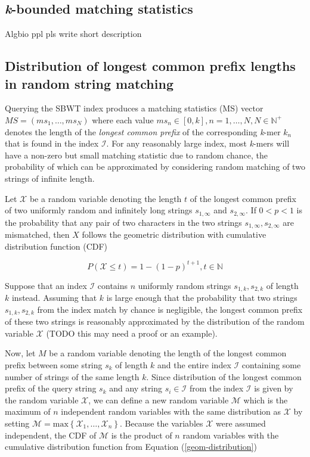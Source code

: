 \documentclass[unnumsec,webpdf,contemporary,large]{oup-authoring-template}%
\theoremstyle{thmstyleone}%
\theoremstyle{thmstyletwo}%
\theoremstyle{thmstylethree}%
\begin{document}
\subsection{\textit{k}-bounded matching statistics}
Algbio ppl pls write short description

\subsection{Distribution of longest common prefix lengths in random string matching}

Querying the SBWT index produces a matching statistics (MS) vector $MS = \left(ms_1, \dots, ms_N\right)$ where each value $ms_n \in \left[0,k\right], n = 1, \dots, N, N \in \mathbb{N}^+$ denotes the length of the \emph{longest common prefix} of the corresponding \emph{k}-mer $k_n$ that is found in the index $\mathcal{I}$. For any reasonably large index, most \emph{k}-mers will have a non-zero but small matching statistic due to random chance, the probability of which can be approximated by considering random matching of two strings of infinite length.

Let $\mathcal{X}$ be a random variable denoting the length $t$ of the longest common prefix of two uniformly random and infinitely long strings $s_{1,\infty}$ and $s_{2,\infty}$. If  $0 < p < 1$ is the probability that any pair of two characters in the two strings $s_{1,\infty}, s_{2,\infty}$ are mismatched, then $X$ follows the geometric distribution with cumulative distribution function (CDF)

\begin{equation}
    P\left(\mathcal{X} \leq t\right) = 1 - \left(1 - p\right)^{t + 1}, t \in \mathbb{N}
\label{geom-distribution}
\end{equation}

Suppose that an index $\mathcal{I}$ contains $n$ uniformly random strings $s_{1,k},s_{2,k}$ of length $k$ instead. Assuming that $k$ is large enough that the probability that two strings $s_{1,k},s_{2,k}$ from the index match by chance is negligible, the longest common prefix of these two strings is reasonably approximated by the distribution of the random variable $\mathcal{X}$ (TODO this may need a proof or an example).

Now, let $M$ be a random variable denoting the length of the longest common prefix between some string $s_{k}$ of length $k$ and the entire index $\mathcal{I}$ containing some number of strings of the same length $k$. Since distribution of the longest common prefix of the query string $s_k$ and any string $s_i \in \mathcal{I}$ from the index $\mathcal{I}$ is given by the random variable $\mathcal{X}$, we can define a new random variable $\mathcal{M}$ which is the maximum of $n$ independent random variables with the same distribution as $\mathcal{X}$ by setting $\mathcal{M} = \text{max}\left\{\mathcal{X}_1,…,\mathcal{X}_n\right\}$. Because the variables $\mathcal{X}$ were assumed independent, the CDF of $\mathcal{M}$ is the product of $n$ random variables with the cumulative distribution function from Equation (\ref{geom-distribution})
\end{document}
